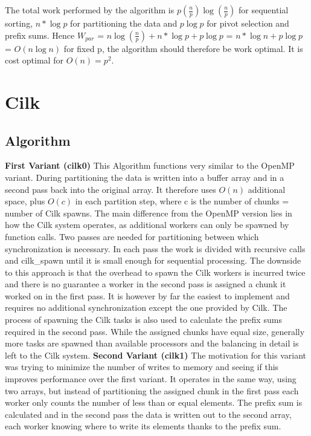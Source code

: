 \documentclass[12pt,a4paper]{article}
\begin{document}
The total work performed by the algorithm is $p(\frac{n}{p})\log(\frac{n}{p})$ for sequential sorting, $n*\log p$ for partitioning the data and $p\log p$ for pivot selection and prefix sums. Hence $W_{par}$ = $n\log(\frac{n}{p}) + n*\log p + p\log p$ = $n*\log n + p\log p$ = $O(n\log n)$ for fixed p, the algorithm should therefore be work optimal. It is cost optimal for $O(n) = p^2$.


\section{Cilk}
\subsection{Algorithm}
\textbf{First Variant (cilk0)}\newline
This Algorithm functions very similar to the OpenMP variant. During partitioning the data is written into a buffer array and in a second pass back into the original array. It therefore uses $O(n)$ additional space, plus $O(c)$ in each partition step, where c is the number of chunks = number of Cilk spawns. 
The main difference from the OpenMP version lies in how the Cilk system operates, as additional workers can only be spawned by function calls. Two passes are needed for partitioning between which synchronization is necessary. In each pass the work is divided with recursive calls and cilk\_spawn until it is small enough for sequential processing. The downside to this approach is that the overhead to spawn the Cilk workers is incurred twice and there is no guarantee a worker in the second pass is assigned a chunk it worked on in the first pass. It is however by far the easiest to implement and requires no additional synchronization except the one provided by Cilk. The process of spawning the Cilk tasks is also used to calculate the prefix sums required in the second pass. While the assigned chunks have equal size, generally more tasks are spawned than available processors and the balancing in detail is left to the Cilk system.
\newline\newline
\textbf{Second Variant (cilk1)}\newline
The motivation for this variant was trying to minimize the number of writes to memory and seeing if this improves performance over the first variant. It operates in the same way, using two arrays, but instead of partitioning the assigned chunk in the first pass each worker only counts the number of less than or equal elements. The prefix sum is calculated and in the second pass the data is written out to the second array, each worker knowing where to write its elements thanks to the prefix sum. 
\end{document}
